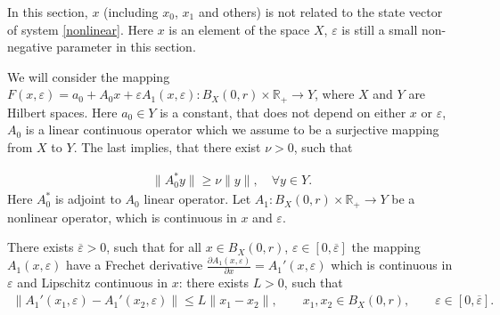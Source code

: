 \documentclass[../main.tex]{subfiles}
\begin{document}
In this section, $x$ (including $x_0$, $x_1$ and others) is not related to the state vector of system \eqref{nonlinear}.
Here $x$ is an element of the space $X$, $\varepsilon$ is still a small non-negative parameter in this section.

We will consider the mapping $F(x, \varepsilon) = a_0 + A_0x + \varepsilon A_1(x,\varepsilon): B_X(0, r) \times \mathbb{R}_+ \rightarrow Y$, where $X$ and $Y$ are Hilbert spaces. Here $a_0 \in Y$ is a constant, that does not depend on either $x$ or $\varepsilon$, $A_0$ is a linear continuous operator which we assume to be a surjective mapping from $X$ to $Y$. 
The last implies, that there exist $\nu > 0$, such that 

\begin{gather}\label{regular}
	\| A_0^*y\| \geqslant \nu \|y\|, \quad \forall y \in Y.
\end{gather}
Here $A_0^* $ is adjoint to $A_0$ linear operator.
Let $A_1: B_X(0, r) \times \mathbb{R}_+ \to Y $ be a nonlinear operator, which is continuous in $x$ and $\varepsilon$.
\begin{assumption}\label{as:derivative_of_A1}
	There exists $\overline{\varepsilon} > 0$, such that for all $x \in B_X(0,r)$, $\varepsilon \in [0, \overline{\varepsilon}]$ the mapping $A_1(x, \varepsilon)$ have a Frechet derivative $\frac{\partial A_1(x, \varepsilon)}{\partial x} = A_1'(x, \varepsilon)$ which is continuous in $\varepsilon$ and Lipschitz continuous in $x$: there exists $L>0$, such that
	\begin{gather*}
		\|A_1'(x_1,\varepsilon) - A_1'(x_2,\varepsilon) \| \leqslant L\|x_1-x_2\|, \qquad x_1, x_2 \in B_X(0,r), \qquad \varepsilon \in [0, \overline{\varepsilon}].
	\end{gather*}
\end{assumption}
\end{document}
